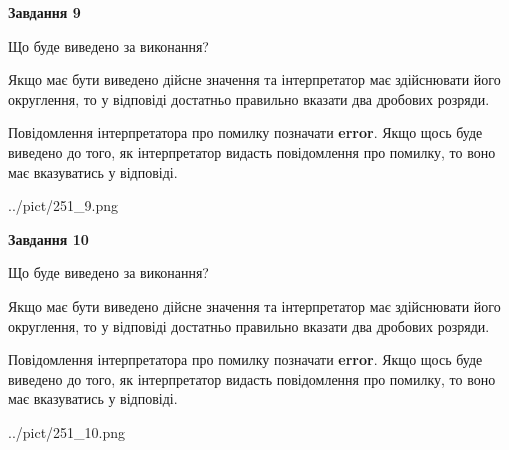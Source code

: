 \documentclass[12pt, ukrainian]{article}
\begin{document}
{\begin {Large}
{\begin {center}\textbf{Завдання 9}\end {center}}\par
Що буде виведено за виконання? \par

Якщо має бути виведено дійсне значення та інтерпретатор має здійснювати його округлення, 
то у відповіді достатньо правильно вказати два дробових розряди.

Повідомлення інтерпретатора про помилку позначати \textbf{error}.
Якщо щось буде виведено до того, як інтерпретатор видасть повідомлення про помилку, 
то воно має вказуватись у відповіді. \par

\begin{center}
	{../pict/251_9.png}
\end{center}
\newpage

{\begin {center}\textbf{Завдання 10}\end {center}}\par
Що буде виведено за виконання? \par

Якщо має бути виведено дійсне значення та інтерпретатор має здійснювати його округлення, 
то у відповіді достатньо правильно вказати два дробових розряди.

Повідомлення інтерпретатора про помилку позначати \textbf{error}.
Якщо щось буде виведено до того, як інтерпретатор видасть повідомлення про помилку, 
то воно має вказуватись у відповіді. \par

\begin{center}
	{../pict/251_10.png}
\end{center}
\newpage

\end {Large}}
\end{document}
